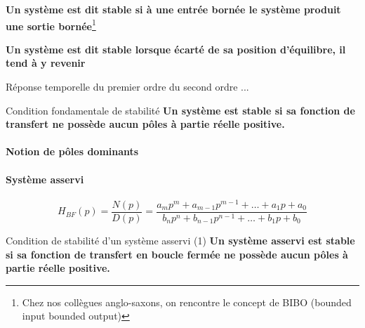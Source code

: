 \textbf{Un système est dit stable si à une entrée bornée le système produit une sortie bornée}\footnote{Chez 
nos collègues anglo-saxons, on rencontre le concept de BIBO (\og bounded input bounded output\fg)}

\textbf{Un système est dit stable lorsque écarté de sa position d'équilibre, il tend à y revenir}

\acpl
Réponse temporelle du premier ordre du second ordre ...

\begin{criteria}{Condition fondamentale de stabilité}
    \textbf{Un système est stable si sa fonction de transfert ne possède aucun pôles à partie réelle positive.}
\end{criteria}



\paragraph{Notion de pôles dominants}

\paragraph{Système asservi}

\begin{center}
\end{center}

$$
H_{BF}(p)=\dfrac{N(p)}{D(p)}=\dfrac{a_mp^m+a_{m-1}p^{m-1}+\ldots+a_1p+a_0}{b_np^n+b_{n-1}p^{n-1}+\ldots+b_1p+b_0}
$$

\begin{criteria}{Condition de stabilité d'un système asservi (1)}
    \textbf{Un système asservi est stable si sa fonction de transfert en boucle fermée 
    ne possède aucun pôles à partie réelle positive.}
\end{criteria}


